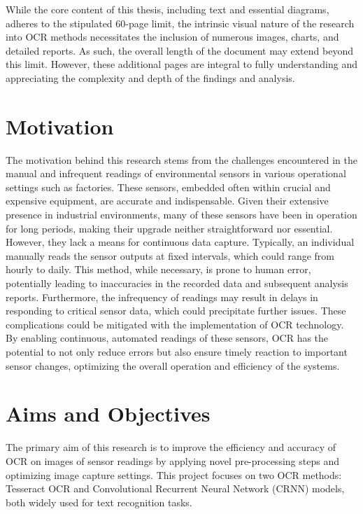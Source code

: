 While the core content of this thesis, including text and essential diagrams, adheres to the stipulated 60-page limit, the intrinsic visual nature of the research into OCR methods necessitates the inclusion of numerous images, charts, and detailed reports. As such, the overall length of the document may extend beyond this limit. However, these additional pages are integral to fully understanding and appreciating the complexity and depth of the findings and analysis.

\newpage

\section{Motivation}

The motivation behind this research stems from the challenges encountered in the manual and infrequent readings of environmental sensors in various operational settings such as factories. These sensors, embedded often within crucial and expensive equipment, are accurate and indispensable. Given their extensive presence in industrial environments, many of these sensors have been in operation for long periods, making their upgrade neither straightforward nor essential. However, they lack a means for continuous data capture. Typically, an individual manually reads the sensor outputs at fixed intervals, which could range from hourly to daily. This method, while necessary, is prone to human error, potentially leading to inaccuracies in the recorded data and subsequent analysis reports. Furthermore, the infrequency of readings may result in delays in responding to critical sensor data, which could precipitate further issues. These complications could be mitigated with the implementation of OCR technology. By enabling continuous, automated readings of these sensors, OCR has the potential to not only reduce errors but also ensure timely reaction to important sensor changes, optimizing the overall operation and efficiency of the systems.

\section{Aims and Objectives}
The primary aim of this research is to improve the efficiency and accuracy of OCR on images of sensor readings by applying novel pre-processing steps and optimizing image capture settings. This project focuses on two OCR methods: Tesseract OCR and Convolutional Recurrent Neural Network (CRNN) models, both widely used for text recognition tasks.

